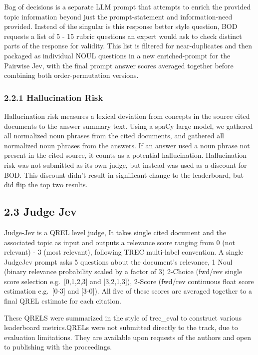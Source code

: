 \documentclass[
  10pt,
]{article}
\begin{document}
Bag of decisions is a separate LLM prompt that attempts to enrich the
provided topic information beyond just the prompt-statement and
information-need provided. Instead of the singular is this response
better style question, BOD requests a list of 5 - 15 rubric questions an
expert would ask to check distinct parts of the response for validity.
This list is filtered for near-duplicates and then packaged as
individual NOUL questions in a new enriched-prompt for the Pairwise Jev,
with the final prompt answer scores averaged together before combining
both order-permutation versions.

\subsubsection{2.2.1 Hallucination Risk}\label{hallucination-risk}

Hallucination risk measures a lexical deviation from concepts in the
source cited documents to the answer summary text. Using a spaCy large
model, we gathered all normalized noun phrases from the cited documents,
and gathered all normalized noun phrases from the answers. If an answer
used a noun phrase not present in the cited source, it counts as a
potential hallucination. Hallucination risk was not submitted as its own
judge, but instead was used as a discount for BOD. This discount didn't
result in significant change to the leaderboard, but did flip the top
two results.

\subsection{2.3 Judge Jev}\label{judge-jev}

Judge-Jev is a QREL level judge, It takes single cited document and the
associated topic as input and outputs a relevance score ranging from 0
(not relevant) - 3 (most relevant), following TREC multi-label
convention. A single JudgeJev prompt asks 5 questions about the
document's relevance, 1 Noul (binary relevance probability scaled by a
factor of 3) 2-Choice (fwd/rev single score selection e.g.~{[}0,1,2,3{]}
and {[}3,2,1,3{]}), 2-Score (fwd/rev continuous float score estimation
e.g.~{[}0-3{]} and {[}3-0{]}). All five of these scores are averaged
together to a final QREL estimate for each citation.

These QRELS were summarized in the style of trec\_eval to construct
various leaderboard metrics.QRELs were not submitted directly to the
track, due to evaluation limitations. They are available upon requests
of the authors and open to publishing with the proceedings.
\end{document}
